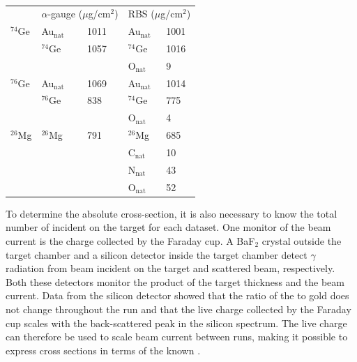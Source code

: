 \begin{table}[htp]
\centering
\begin{tabular}{lllll}
 & \multicolumn{2}{c}{$\alpha$-gauge ($\mu$g/cm$^2$)} & \multicolumn{2}{c}{RBS ($\mu$g/cm$^2$)} \\
\cline{2-3}\cline{4-5}
$^{74}$Ge & Au$_{\text{nat}}$ & 1011 & Au$_{\text{nat}}$ & 1001 \\
          & $^{74}$Ge & 1057 & $^{74}$Ge & 1016 \\
          &           &      & O$_{\text{nat}}$ & 9 \\[0.35cm]

$^{76}$Ge & Au$_{\text{nat}}$ & 1069 & Au$_{\text{nat}}$ & 1014 \\
          & $^{76}$Ge & 838 & $^{74}$Ge & 775 \\
          &           &      & O$_{\text{nat}}$ & 4 \\[0.35cm]

$^{26}$Mg & $^{26}$Mg & 791 & $^{26}$Mg & 685 \\
          &           &      & C$_{\text{nat}}$ & 10 \\
          &           &      & N$_{\text{nat}}$ & 43 \\
          &           &      & O$_{\text{nat}}$ & 52 \\
\end{tabular}
\caption{}
\label{tab:targets}
\end{table}

To determine the absolute cross-section, it is also necessary to know the total number of  incident on the target for each dataset.  One monitor of the beam current is the charge collected by the Faraday cup.  A BaF$_2$ crystal outside the target chamber and a silicon detector inside the target chamber detect $\gamma$ radiation from beam incident on the target and scattered  beam, respectively.  Both these detectors monitor the product of the target thickness and the beam current.  Data from the silicon detector showed that the ratio of the \GeTargets to gold does not change throughout the run and that the live charge collected by the Faraday cup scales with the back-scattered peak in the silicon spectrum.  The live charge can therefore be used to scale beam current between runs, making it possible to express \reaction cross sections in terms of the known \MgReaction.

